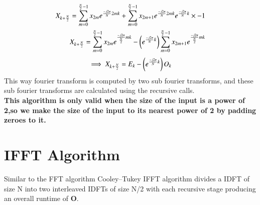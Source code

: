 \documentclass[journal,12pt,twocolumn]{IEEEtran}
\begin{document}
\begin{align}
     X_{k+\frac{N}{2}} = \sum _{m=0}^{\frac{N}{2}-1}x_{2m}e^{\frac{-j2\pi}{N}2mk} + \sum _{m=0}^{\frac{N}{2}-1}x_{2m+1}e^{\frac{-j2\pi}{N}2mk}e^{\frac{-j2\pi}{N}k}\times -1
     \\
X_{k+\frac{N}{2}} = \sum _{m=0}^{\frac{N}{2}-1}x_{2m}e^{\frac{-j2\pi}{\frac{N}{2}}mk} - \left( e^{\frac{-j2\pi}{N}k}\right)\sum _{m=0}^{\frac{N}{2}-1}x_{2m+1}e^{\frac{-j2\pi}{\frac{N}{2}}mk}
\end{align}
\begin{align}
\implies X_{k+\frac{N}{2}} = E_{k} - \left( e^{\frac{-j2\pi}{N}k}\right)O_{k}
\end{align}
This way fourier transform is computed by two sub fourier transforms, and these sub fourier transforms are calculated using the recursive calls.
\\
\textbf{This algorithm is only valid when the size of the input is a power of 2,so we make the size of the input to its nearest power of 2 by padding zeroes to it.}

\section{IFFT Algorithm}
Similar to the FFT algorithm Cooley–Tukey IFFT algorithm divides a IDFT of size N into two interleaved IDFTs of size N/2 with each recursive stage producing an overall runtime of \textbf{O}.
\\
\end{document}
